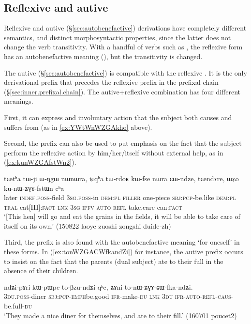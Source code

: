  \subsection{Reflexive and autive} \label{sec:refl.autoben}
Reflexive and autive (§\ref{sec:autobenefactive}) derivations have completely different semantics, and distinct morphosyntactic properties, since the latter does not change the verb transitivity. With a handful of verbs such as , the reflexive form has an autobenefactive meaning (), but the transitivity is changed. 
 
The autive  (§\ref{sec:autobenefactive}) is compatible with the reflexive . It is the only derivational prefix that precedes the reflexive prefix in the prefixal chain (§\ref{sec:inner.prefixal.chain}). The autive+reflexive combination has four different meanings.

First, it can express and involuntary action that the subject both causes and suffers from (as in \ref{ex:YWtWnWZGAkho} above).

Second, the  prefix can also be used to put emphasis on the fact that the subject perform the reflexive action by him/her/itself without external help, as in (\ref{ex:kunWZGAfstWn2}).

\begin{exe}
\ex \label{ex:kunWZGAfstWn2}
\gll  tɕetʰa tɯ-ji ɯ-ŋgɯ nɯnɯra, iɕqʰa tɯ-rdoʁ kɯ-fse nɯra ɕɯ-ndze, tɕendɤre, ɯʑo ku-nɯ-ʑɣɤ-fstɯn cʰa   \\
later \textsc{indef}.\textsc{poss}-field \textsc{3sg}.\textsc{poss}-in \textsc{dem}:\textsc{pl} \textsc{filler} one-piece \textsc{sbj}:\textsc{pcp}-be.like \textsc{dem}:\textsc{pl} \textsc{tral}-eat[III]:\textsc{fact} \textsc{lnk} \textsc{3sg} \textsc{ipfv}-\textsc{auto}-\textsc{refl}-take.care can:\textsc{fact}   \\
\glt `[This hen] will go and eat the grains in the fields, it will be able to take care of itself on its own.' (150822 laoye zuoshi zongshi duide-zh)
\end{exe} 

Third, the  prefix is also found with the autobenefactive meaning `for oneself' in these forms. In (\ref{ex:tonWZGACWfkandZi}) for instance, the autive prefix occurs to insist on the fact that the parents (dual subject) ate to their full in the absence of their children.

\begin{exe}
\ex \label{ex:tonWZGACWfkandZi}
\gll ndʑi-pɤri kɯ-pɯ\redp{}pe to-βzu-ndʑi qʰe, ʑɤni to-nɯ-ʑɣɤ-ɕɯ-fka-ndʑi. \\
\textsc{3du}.\textsc{poss}-diner \textsc{sbj}:\textsc{pcp}-\textsc{emph}\redp{}be.good \textsc{ifr}-make-\textsc{du} \textsc{lnk} \textsc{3du} \textsc{ifr}-\textsc{auto}-\textsc{refl}-\textsc{caus}-be.full-\textsc{du} \\
\glt `They made a nice diner for themselves, and ate to their fill.' (160701 poucet2) 
\end{exe}

